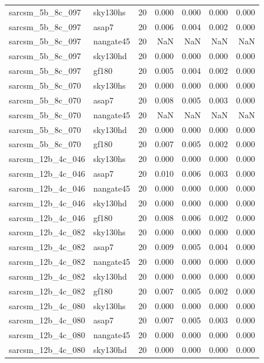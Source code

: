 \begin{tabular}{llrrrrr}
sarcsm\_5b\_8c\_097 & sky130hs & 20 & 0.000 & 0.000 & 0.000 & 0.000 \\
sarcsm\_5b\_8c\_097 & asap7 & 20 & 0.006 & 0.004 & 0.002 & 0.000 \\
sarcsm\_5b\_8c\_097 & nangate45 & 20 & NaN & NaN & NaN & NaN \\
sarcsm\_5b\_8c\_097 & sky130hd & 20 & 0.000 & 0.000 & 0.000 & 0.000 \\
sarcsm\_5b\_8c\_097 & gf180 & 20 & 0.005 & 0.004 & 0.002 & 0.000 \\
sarcsm\_5b\_8c\_070 & sky130hs & 20 & 0.000 & 0.000 & 0.000 & 0.000 \\
sarcsm\_5b\_8c\_070 & asap7 & 20 & 0.008 & 0.005 & 0.003 & 0.000 \\
sarcsm\_5b\_8c\_070 & nangate45 & 20 & NaN & NaN & NaN & NaN \\
sarcsm\_5b\_8c\_070 & sky130hd & 20 & 0.000 & 0.000 & 0.000 & 0.000 \\
sarcsm\_5b\_8c\_070 & gf180 & 20 & 0.007 & 0.005 & 0.002 & 0.000 \\
sarcsm\_12b\_4c\_046 & sky130hs & 20 & 0.000 & 0.000 & 0.000 & 0.000 \\
sarcsm\_12b\_4c\_046 & asap7 & 20 & 0.010 & 0.006 & 0.003 & 0.000 \\
sarcsm\_12b\_4c\_046 & nangate45 & 20 & 0.000 & 0.000 & 0.000 & 0.000 \\
sarcsm\_12b\_4c\_046 & sky130hd & 20 & 0.000 & 0.000 & 0.000 & 0.000 \\
sarcsm\_12b\_4c\_046 & gf180 & 20 & 0.008 & 0.006 & 0.002 & 0.000 \\
sarcsm\_12b\_4c\_082 & sky130hs & 20 & 0.000 & 0.000 & 0.000 & 0.000 \\
sarcsm\_12b\_4c\_082 & asap7 & 20 & 0.009 & 0.005 & 0.004 & 0.000 \\
sarcsm\_12b\_4c\_082 & nangate45 & 20 & 0.000 & 0.000 & 0.000 & 0.000 \\
sarcsm\_12b\_4c\_082 & sky130hd & 20 & 0.000 & 0.000 & 0.000 & 0.000 \\
sarcsm\_12b\_4c\_082 & gf180 & 20 & 0.007 & 0.005 & 0.002 & 0.000 \\
sarcsm\_12b\_4c\_080 & sky130hs & 20 & 0.000 & 0.000 & 0.000 & 0.000 \\
sarcsm\_12b\_4c\_080 & asap7 & 20 & 0.007 & 0.005 & 0.003 & 0.000 \\
sarcsm\_12b\_4c\_080 & nangate45 & 20 & 0.000 & 0.000 & 0.000 & 0.000 \\
sarcsm\_12b\_4c\_080 & sky130hd & 20 & 0.000 & 0.000 & 0.000 & 0.000 \\

\end{tabular}
